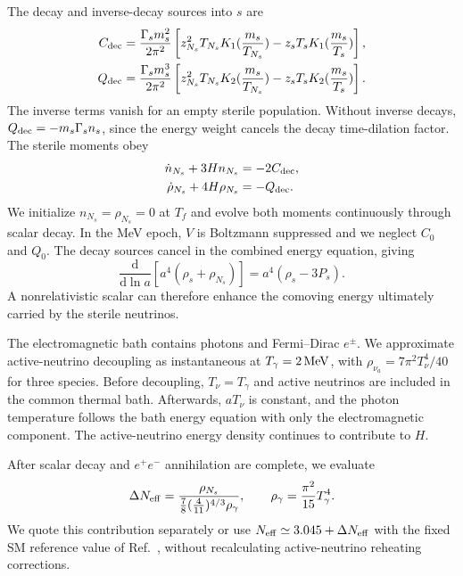 \documentclass[prd,showpacs,preprintnumbers,amsmath,amssymb,twocolumn,
superscriptaddress,notitlepage]{revtex4-2}
\begin{document}
The decay and inverse-decay sources into $s$ are
\cite{EscuderoAbenza:2020cmq}
\begin{align}
C_{\rm dec}
&=\frac{\Gamma_s m_s^2}{2\pi^2}
\left[z_{N_s}^2T_{N_s}K_1(\frac{m_s}{T_{N_s}})
-z_sT_sK_1(\frac{m_s}{T_s})\right],
\label{eq:scalar-decay-number}
\\
Q_{\rm dec}
&=\frac{\Gamma_s m_s^3}{2\pi^2}
\left[z_{N_s}^2T_{N_s}K_2(\frac{m_s}{T_{N_s}})
-z_sT_sK_2(\frac{m_s}{T_s})\right].
\label{eq:scalar-decay-energy}
\end{align}
The inverse terms vanish for an empty sterile population.
Without inverse decays, $Q_{\rm dec}=-m_s\Gamma_s n_s$,
since the energy weight cancels the decay time-dilation
factor. 
The sterile moments obey
\begin{align}
\dot n_{N_s}+3Hn_{N_s}&=-2C_{\rm dec},\\
\dot\rho_{N_s}+4H\rho_{N_s}&=-Q_{\rm dec}.
\label{eq:sterile-energy-evolution}
\end{align}
We initialize $n_{N_s}=\rho_{N_s}=0$ at $T_f$ and evolve
both moments continuously through scalar decay.
In the MeV epoch, $V$ is Boltzmann suppressed and we
neglect $C_0$ and $Q_0$. The decay sources cancel in the
combined energy equation, giving
\begin{equation}
\frac{\mathrm d}{\mathrm d\ln a}
\left[a^4(\rho_s+\rho_{N_s})\right]
=a^4(\rho_s-3P_s).
\end{equation}
A nonrelativistic scalar can therefore enhance the
comoving energy ultimately carried by the sterile neutrinos.

The electromagnetic bath contains photons and
Fermi--Dirac $e^\pm$. We approximate active-neutrino
decoupling as instantaneous at $T_\gamma=2\,{\rm MeV}$,
with $\rho_{\nu_a}=7\pi^2T_\nu^4/40$ for three species.
Before decoupling, $T_\nu=T_\gamma$ and active neutrinos
are included in the common thermal bath.
Afterwards, $aT_\nu$ is constant, and the photon temperature
follows the bath energy equation with only the
electromagnetic component. The active-neutrino energy
density continues to contribute to $H$.

After scalar decay and $e^+e^-$ annihilation are complete,
we evaluate
\begin{equation}
\Delta N_{\rm eff}
=\frac{\rho_{N_s}}
{\frac78(\frac4{11})^{4/3}\rho_\gamma},
\qquad
\rho_\gamma=\frac{\pi^2}{15}T_\gamma^4.
\label{eq:sterile-delta-neff}
\end{equation}
We quote this contribution separately or use
$N_{\rm eff}\simeq3.045+\Delta N_{\rm eff}$ with the
fixed SM reference value of
Ref.~\cite{EscuderoAbenza:2020cmq},
without recalculating active-neutrino reheating corrections.
\end{document}
